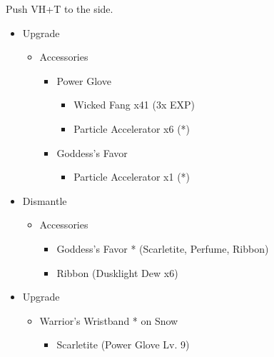 Push VH+T to the side.
\vfill
\ 
\columnbreak
\begin{upgrade}
	\begin{itemize}
		\item Upgrade
		      \begin{itemize}
			      \item Accessories
			            \begin{itemize}
				            \item Power Glove
				                  \begin{itemize}
					                  \item Wicked Fang x41 (3x EXP)
					                  \item Particle Accelerator x6 (*)
				                  \end{itemize}
				            \item Goddess's Favor
				                  \begin{itemize}
					                  \item Particle Accelerator x1 (*)
				                  \end{itemize}
			            \end{itemize}
		      \end{itemize}
		\item Dismantle
		      \begin{itemize}
			      \item Accessories
			            \begin{itemize}
				            \item Goddess's Favor * (Scarletite, Perfume, Ribbon)
				            \item Ribbon (Dusklight Dew x6)
			            \end{itemize}
		      \end{itemize}
		\item Upgrade
		      \begin{itemize}
			      \item Warrior's Wristband * on Snow
			            \begin{itemize}
				            \item Scarletite (Power Glove Lv. 9)
			            \end{itemize}
		      \end{itemize}
	\end{itemize}
\end{upgrade}
	{  }
	{ 
	  {
	}
}

